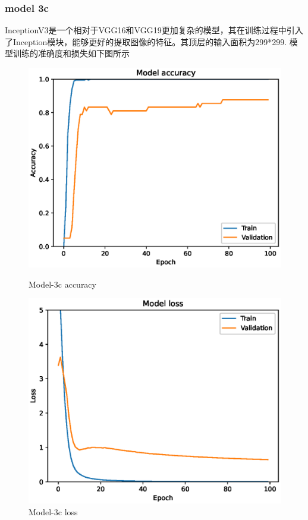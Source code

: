\subsubsection{model 3c}
InceptionV3是一个相对于VGG16和VGG19更加复杂的模型，其在训练过程中引入了Inception模块，能够更好的提取图像的特征。其顶层的输入面积为299*299.
模型训练的准确度和损失如下图所示

\begin{figure}
    \centering
    \begin{minipage}{0.45\textwidth}
        \centering
        \includegraphics[width=\textwidth]{./fig/model3/accuracy3c.eps}
        \caption{Model-3c accuracy}
        \label{fig:model3c_acc}
    \end{minipage}
    \begin{minipage}{0.45\textwidth}
        \centering
        \includegraphics[width=\textwidth]{./fig/model3/loss3c.eps}
        \caption{Model-3c loss}
        \label{fig:model3c_loss}
    \end{minipage}
\end{figure}

